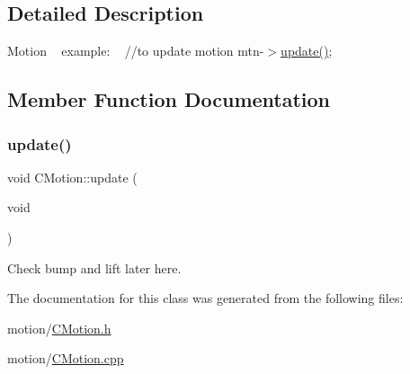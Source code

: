 \subsection{Detailed Description}
Motion ~\newline
 example\+: ~\newline
 //to update motion mtn-\/$>$\mbox{\hyperlink{classmotion_1_1CMotion_a7e4c27c99fca247140ff23e693be7e7a}{update()}}; ~\newline


\subsection{Member Function Documentation}
\mbox{\label{classmotion_1_1CMotion_a7e4c27c99fca247140ff23e693be7e7a}} 
\subsubsection{\texorpdfstring{update()}{update()}}
{\footnotesize\ttfamily void C\+Motion\+::update (\begin{DoxyParamCaption}\item[{void}]{ }\end{DoxyParamCaption})}

Check bump and lift later here. 

The documentation for this class was generated from the following files\+:\begin{DoxyCompactItemize}
\item 
motion/\mbox{\hyperlink{CMotion_8h}{C\+Motion.\+h}}\item 
motion/\mbox{\hyperlink{CMotion_8cpp}{C\+Motion.\+cpp}}\end{DoxyCompactItemize}
